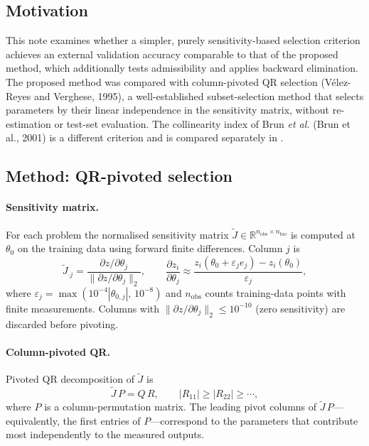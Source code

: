 
\subsection*{Motivation}

This note examines whether a simpler, purely sensitivity-based selection criterion achieves an external validation accuracy comparable to that of the proposed method, which additionally tests admissibility and applies backward elimination. The proposed method was compared with column-pivoted QR selection (Vélez-Reyes and Verghese, 1995), a well-established subset-selection method that selects parameters by their linear independence in the sensitivity matrix, without re-estimation or test-set evaluation. The collinearity index of Brun \emph{et al.} (Brun et al., 2001) is a different criterion and is compared separately in .

\subsection*{Method: QR-pivoted selection}

\paragraph{Sensitivity matrix.}
For each problem the normalised sensitivity matrix $\widetilde{J}\in\mathbb{R}^{n_{\mathrm{obs}}\times n_{\mathrm{bio}}}$ is computed at $\theta_0$ on the training data using forward finite differences.  Column $j$ is
\[
  \widetilde{J}_{\cdot j} = \frac{\partial z / \partial\theta_j}{\|\partial z / \partial\theta_j\|_2},
  \qquad
  \frac{\partial z_i}{\partial\theta_j} \approx \frac{z_i(\theta_0 + \varepsilon_j e_j) - z_i(\theta_0)}{\varepsilon_j},
\]
where $\varepsilon_j = \max(10^{-4}|\theta_{0,j}|,\, 10^{-8})$ and $n_{\mathrm{obs}}$ counts training-data points with finite measurements. Columns with $\|\partial z/\partial\theta_j\|_2 \le 10^{-10}$ (zero sensitivity) are discarded before pivoting.

\paragraph{Column-pivoted QR.}
Pivoted QR decomposition of $\widetilde{J}$ is
\[
  \widetilde{J}\,P = Q\,R, \qquad |R_{11}| \ge |R_{22}| \ge \cdots,
\]
where $P$ is a column-permutation matrix.  The leading pivot columns of $\widetilde{J}\,P$---equivalently, the first entries of $P$---correspond to the parameters that contribute most independently to the measured outputs.

